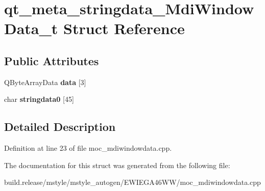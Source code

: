 \hypertarget{structqt__meta__stringdata___mdi_window_data__t}{}\section{qt\+\_\+meta\+\_\+stringdata\+\_\+\+Mdi\+Window\+Data\+\_\+t Struct Reference}
\label{structqt__meta__stringdata___mdi_window_data__t}
\subsection*{Public Attributes}
\begin{DoxyCompactItemize}
\item 
\mbox{\label{structqt__meta__stringdata___mdi_window_data__t_a8763a05ba9a91f9053d071aadc3c6551}} 
Q\+Byte\+Array\+Data {\bfseries data} \mbox{[}3\mbox{]}
\item 
\mbox{\label{structqt__meta__stringdata___mdi_window_data__t_aea37542c26f60a18e0adf08bbb5a7cfa}} 
char {\bfseries stringdata0} \mbox{[}45\mbox{]}
\end{DoxyCompactItemize}


\subsection{Detailed Description}


Definition at line 23 of file moc\+\_\+mdiwindowdata.\+cpp.



The documentation for this struct was generated from the following file\+:\begin{DoxyCompactItemize}
\item 
build.\+release/mstyle/mstyle\+\_\+autogen/\+E\+W\+I\+E\+G\+A46\+W\+W/moc\+\_\+mdiwindowdata.\+cpp\end{DoxyCompactItemize}
